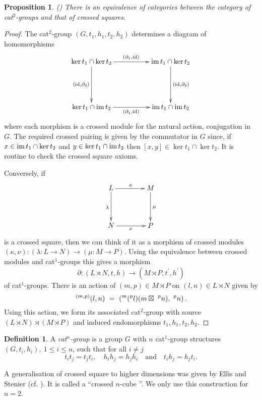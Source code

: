 \documentclass[a4paper,11pt]{article}
\theoremstyle{plain}
\newtheorem{proposition}[theorem]{Proposition}
\theoremstyle{definition}
\newtheorem{definition}[theorem]{Definition}
\begin{document}
\begin{proposition}
\label{loday} \emph{(\cite{Loday})} 
There is an equivalence of categories between the category of cat$^{2}$-groups 
and that of crossed squares.
\end{proposition}
\begin{proof}
The cat$^{2}$-group $(G,t_1,h_1,t_2,h_2)$ determines a diagram of homomorphisms 
\[
\xymatrix@R=50pt@C=50pt
{ \ker t_1 \cap \ker t_2 \ar[d]_{(\id,\partial_2)} \ar[r]^{(\partial_1,\id)} 
  	  & \im t_1 \cap \ker t_2 \ar[d]^{(\id,\partial_2)} \\ 
  \ker t_1 \cap \im t_2 \ar[r]_{(\partial_1,\id)}  
	  & \im t_1 \cap \im t_2 } 
\]
\noindent where each morphism is a crossed module for the natural action, 
conjugation in $G$. 
The required crossed pairing is given by the commutator in $G$ since, 
if $x \in \mathrm{im}\, t_1 \cap \ker t_2$ and $y \in \ker t_1 \cap \mathrm{im}\, t_2$ 
then $[x,y] \in \ker t_1 \cap \ker t_2$. 
It is routine to check the crossed square axioms.
	
Conversely, if
\[
\xymatrix@R=40pt@C=40pt
{ L \ar[d]_{\lambda} \ar[r]^{\kappa}  
	  & M \ar[d]^{\mu} \\ 
  N \ar[r]_{\nu} 
	  & P }  
\]
\noindent is a crossed square, 
then we can think of it as a morphism of crossed modules 
$(\kappa,\nu) : (\lambda : L \to N) \rightarrow (\mu : M  \to P)$.
Using the equivalence between crossed modules and cat$^{1}$-groups this
gives a morphism
\[
\partial : (L \rtimes N,t,h) \longrightarrow (M \rtimes P, t^{\prime}, h^{\prime})
\]
of cat$^{1}$-groups. 
There is an action of $(m,p) \in M \rtimes P$ on $(l,n) \in L \rtimes N$ 
given by
\[
^{(m,p)}(l,n) ~=~ (^{m}(^{p}l) (m \boxtimes\ ^{p}n),\ ^{p}n)\,.
\] 
Using this action, we form its associated cat$^{2}$-group with source  
$(L \rtimes N) \rtimes (M \rtimes P)$ 
and induced endomorphisms $t_1,h_1,t_2,h_2$. 
\end{proof}

\begin{definition}
A \emph{cat$^{n}$-group} is a group $G$ with $n$ cat$^{1}$-group structures  
$(G,t_{i},h_{i}),~ 1\leq i\leq n$, such that for all $i \ne j$ 
\[
t_{i}t_{j} = t_{j}t_{i}, \quad 
h_{i}h_{j} = h_{j}h_{i} \quad \mbox{and} \quad 
t_{i}h_{j} = h_{j}t_{i}. 
\]
\end{definition}

A generalisation of crossed square to higher dimensions was given by Ellis
and Stenier (cf. \cite{ellis-stenier}). 
It is called a \textquotedblleft crossed $n$-cube \textquotedblright. 
We only use this construction for $n=2$.
\end{document}
